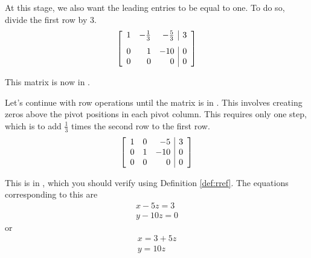 \begin{solution}
At this stage, we also want the leading entries to be equal to one. To do so, divide the first row by $3$.
\begin{equation*}
\leftB
\begin{array}{rrr|r}
1 & -\vspace{0.05in}\frac{1}{3} &  -\vspace{0.05in}\frac{5}{3} & 3 \\
0 &  1 & -10 & 0 \\
0 &  0 &   0 & 0
\end{array}
\rightB
\end{equation*}

This matrix is now in \ef. 

Let's continue with row operations until the matrix is in \rref. 
This involves creating zeros above the pivot positions in each pivot column. 
This requires only one step, which is to add $ \frac{1}{3}$ times the second row to the first row.
\begin{equation*}
\left[
\begin{array}{rrr|r}
1 & 0 & -5 & 3 \\
0 & 1 & -10 & 0 \\
0 & 0 & 0 & 0
\end{array}
\right] 
\end{equation*}


This is in \rref, which you should verify using Definition \ref{def:rref}.
 The equations corresponding to this \rref \;are
\[
\begin{array}{c}
x - 5z=3 \\
y - 10z = 0 
\end{array}
\]
or
\[
\begin{array}{c}
x=3+5z \\
y = 10z
\end{array}
\]


\end{solution}

